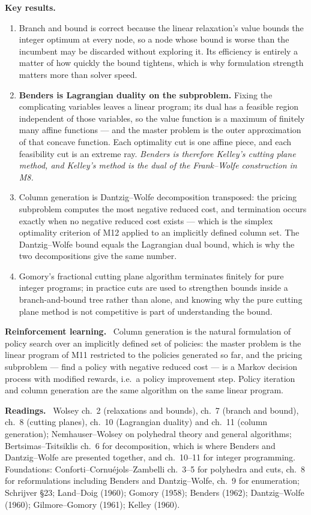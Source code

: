 \documentclass[11pt,a4paper]{article}
\newcommand{\mpart}[1]{\smallskip\noindent\textbf{#1}\ \ignorespaces}
\begin{document}
\mpart{Key results.}
\begin{enumerate}
\item Branch and bound is correct because the linear relaxation's value bounds the integer
optimum at every node, so a node whose bound is worse than the incumbent may be discarded
without exploring it. Its efficiency is entirely a matter of how quickly the bound tightens,
which is why formulation strength matters more than solver speed.
\item \textbf{Benders is Lagrangian duality on the subproblem.} Fixing the complicating
variables leaves a linear program; its dual has a feasible region independent of those
variables, so the value function is a maximum of finitely many affine functions --- and the
master problem is the outer approximation of that concave function. Each optimality cut is one
affine piece, and each feasibility cut is an extreme ray. \emph{Benders is therefore Kelley's
cutting plane method, and Kelley's method is the dual of the Frank--Wolfe construction in M8.}
\item Column generation is Dantzig--Wolfe decomposition transposed: the pricing subproblem
computes the most negative reduced cost, and termination occurs exactly when no negative
reduced cost exists --- which is the simplex optimality criterion of M12 applied to an
implicitly defined column set. The Dantzig--Wolfe bound equals the Lagrangian dual bound, which
is why the two decompositions give the same number.
\item Gomory's fractional cutting plane algorithm terminates finitely for pure integer programs;
in practice cuts are used to strengthen bounds inside a branch-and-bound tree rather than alone,
and knowing why the pure cutting plane method is not competitive is part of understanding the
bound.
\end{enumerate}

\mpart{Reinforcement learning.} Column generation is the natural formulation of policy search
over an implicitly defined set of policies: the master problem is the linear program of M11
restricted to the policies generated so far, and the pricing subproblem --- find a policy with
negative reduced cost --- is a Markov decision process with modified rewards, i.e.\ a policy
improvement step. Policy iteration and column generation are the same algorithm on the same
linear program.

\mpart{Readings.} Wolsey ch.~2 (relaxations and bounds), ch.~7 (branch and bound), ch.~8
(cutting planes), ch.~10 (Lagrangian duality) and ch.~11 (column generation); Nemhauser--Wolsey
on polyhedral theory and general algorithms; Bertsimas--Tsitsiklis ch.~6 for decomposition,
which is where Benders and Dantzig--Wolfe are presented together, and ch.~10--11 for integer
programming. Foundations: Conforti--Cornu\'ejols--Zambelli ch.~3--5 for polyhedra and cuts,
ch.~8 for reformulations including Benders and Dantzig--Wolfe, ch.~9 for enumeration;
Schrijver \S 23; Land--Doig (1960); Gomory (1958); Benders (1962); Dantzig--Wolfe (1960);
Gilmore--Gomory (1961); Kelley (1960).
\end{document}
